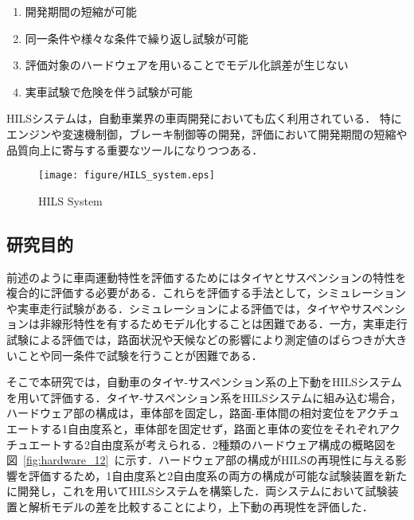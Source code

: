 \documentclass[a4paper,12pt]{article_vdlab_sotsuron}
\begin{document}
\begin{enumerate}
\item 開発期間の短縮が可能
\item 同一条件や様々な条件で繰り返し試験が可能
\item 評価対象のハードウェアを用いることでモデル化誤差が生じない
\item 実車試験で危険を伴う試験が可能
\end{enumerate}

\par
HILSシステムは，自動車業界の車両開発においても広く利用されている．
特にエンジンや変速機制御，ブレーキ制御等の開発，評価において開発期間の短縮や品質向上に寄与する重要なツールになりつつある\cite{3}．

\vspace*{10mm}
\begin{figure}[htp]
  \begin{center}
    \texttt{[image: figure/HILS\_system.eps]}
    \vspace*{3mm}
    \caption{HILS System\cite{4}}
    \label{fig:HILS_system}
  \end{center}
\end{figure}

\newpage
\subsection{研究目的}
前述のように車両運動特性を評価するためにはタイヤとサスペンションの特性を複合的に評価する必要がある．これらを評価する手法として，シミュレーションや実車走行試験がある．シミュレーションによる評価では，タイヤやサスペンションは非線形特性を有するためモデル化することは困難である．一方，実車走行試験による評価では，路面状況や天候などの影響により測定値のばらつきが大きいことや同一条件で試験を行うことが困難である．\par
そこで本研究では，自動車のタイヤ-サスペンション系の上下動をHILSシステムを用いて評価する．タイヤ-サスペンション系をHILSシステムに組み込む場合，ハードウェア部の構成は，車体部を固定し，路面-車体間の相対変位をアクチュエートする1自由度系と，車体部を固定せず，路面と車体の変位をそれぞれアクチュエートする2自由度系が考えられる．2種類のハードウェア構成の概略図を図~\ref{fig:hardware_12}~に示す．ハードウェア部の構成がHILSの再現性に与える影響を評価するため，1自由度系と2自由度系の両方の構成が可能な試験装置を新たに開発し，これを用いてHILSシステムを構築した．両システムにおいて試験装置と解析モデルの差を比較することにより，上下動の再現性を評価した．
\end{document}
